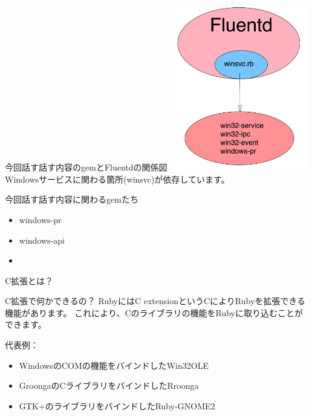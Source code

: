 \documentclass[12pt, unicode]{beamer}
\begin{document}
\begin{frame}{今回話す話す内容のgemとFluentdの関係図}
  \includegraphics[clip,width=6cm]{images/Fluentd_windows_version_dependent_gems.png}\newline
  Windowsサービスに関わる箇所(winsvc)が依存しています。
\end{frame}

\begin{frame}{今回話す話す内容に関わるgemたち}
   \Large{
    \begin{itemize}
    \item windows-pr
    \item windows-api
    \item {}
    \end{itemize}
  }
\end{frame}

\begin{frame}{C拡張とは？}
   {
    \begin{block}{C拡張で何かできるの？}
      RubyにはC extensionというCによりRubyを拡張できる機能があります。\newline
      これにより、Cのライブラリの機能をRubyに取り込むことができます。
    \end{block}
  }
   {代表例：}
  \begin{itemize}
  \item <3-> WindowsのCOMの機能をバインドしたWin32OLE
  \item <4-> GroongaのCライブラリをバインドしたRroonga
  \item <5-> GTK+のライブラリをバインドしたRuby-GNOME2
  \end{itemize}
\end{frame}
\end{document}
